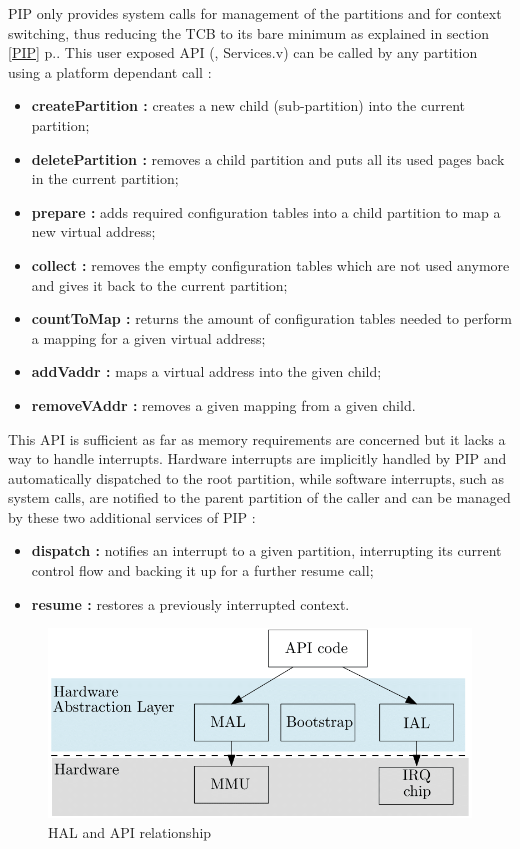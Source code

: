 \noindent PIP only provides system calls for management of the partitions and for context switching, thus reducing the TCB to its bare minimum as explained in section \ref{PIP} p.\pageref{PIP}. This user exposed API (\cite{PIP}, Services.v) can be called by any partition using a platform dependant call :
\begin{itemize}
	\item \textbf{createPartition :} creates a new child (sub-partition) into the current partition;
	\item \textbf{deletePartition :} removes a child partition and puts all its used pages back in the current partition;
	\item \textbf{prepare :} adds required configuration tables into a child partition to map a new virtual address;
	\item \textbf{collect :} removes the empty configuration tables which are not used anymore and gives it back to the current partition; 
	\item \textbf{countToMap :} returns the amount of configuration tables needed to perform a mapping for a given virtual address;
	\item \textbf{addVaddr :} maps a virtual address into the given child;
	\item \textbf{removeVAddr :} removes a given mapping from a given child.
\end{itemize} 
This API is sufficient as far as memory requirements are concerned but it lacks a way to handle interrupts. Hardware interrupts are implicitly handled by PIP and automatically dispatched to the root partition, while software interrupts, such as system calls, are notified to the parent partition of the caller \cite{PIPKernel} and can be managed by these two additional services of PIP :
\begin{itemize}
	\item \textbf{dispatch :} notifies an interrupt to a given partition, interrupting its current control flow and backing it up for a further resume call;
	\item \textbf{resume :} restores a previously interrupted context.
\end{itemize}
\vspace{-0.8em} 
\begin{figure}[!ht]  
	\centering 	\includegraphics[width=0.58\linewidth,frame]{img/HAL.png} 
	\caption[HAL and API relationship]{HAL and API relationship \cite{PIPKernel}}
	\label{HAL}
\end{figure}

